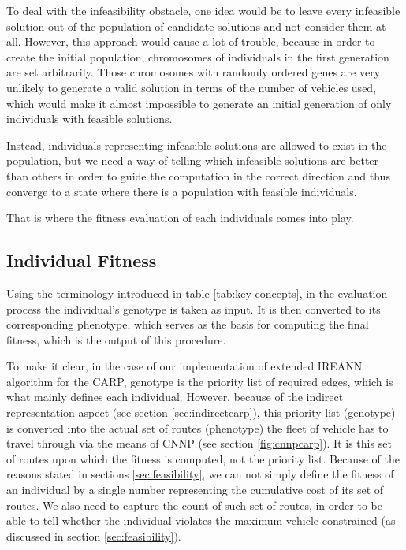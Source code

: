\documentclass[twoside]{ctuthesis}
\theoremstyle{plain}
\theoremstyle{definition}
\theoremstyle{note}
\begin{document}
To deal with the infeasibility obstacle, one idea would be to leave every infeasible solution out of the population of candidate solutions and not consider them at all. However, this approach would cause a lot of trouble, because in order to create the initial population, chromosomes of individuals in the first generation are set arbitrarily. Those chromosomes with randomly ordered genes are very unlikely to generate a valid solution in terms of the number of vehicles used, which would make it almost impossible to generate an initial generation of only individuals with feasible solutions.

Instead, individuals representing infeasible solutions are allowed to exist in the population, but we need a way of telling which infeasible solutions are better than others in order to guide the computation in the correct direction and thus converge to a state where there is a population with feasible individuals. 

That is where the fitness evaluation of each individuals comes into play.

\subsection{Individual Fitness}
\label{sec:fitness}
Using the terminology introduced in table \ref{tab:key-concepts}, in the evaluation process the individual's genotype is taken as input. It is then converted to its corresponding phenotype, which serves as the basis for computing the final fitness, which is the output of this procedure.

To make it clear, in the case of our implementation of extended IREANN algorithm for the CARP, genotype is the priority list of required edges, which is what mainly defines each individual. However, because of the indirect representation aspect (see section \ref{sec:indirectcarp}), this priority list (genotype) is converted into the actual set of routes (phenotype) the fleet of vehicle has to travel through via the means of CNNP (see section \ref{fig:cnnpcarp}). It is this set of routes upon which the fitness is computed, not the priority list. Because of the reasons stated in sections \ref{sec:feasibility}, we can not simply define the fitness of an individual by a single number representing the cumulative cost of its set of routes. We also need to capture the count of such set of routes, in order to be able to tell whether the individual violates the maximum vehicle constrained (as discussed in section \ref{sec:feasibility}). 
\end{document}
